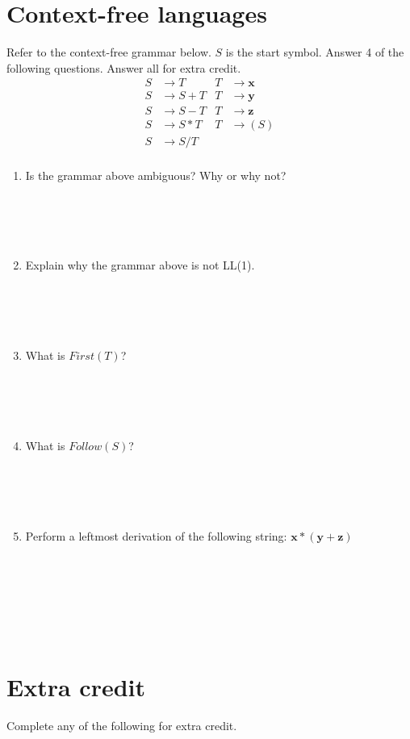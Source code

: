 \documentclass[10pt]{amsart}
\begin{document}
\section{Context-free languages}
Refer to the context-free grammar below. $S$ is the start symbol. Answer 4 of the following questions. Answer all for extra credit.
\begin{align*}
S &\to T &  T &\to \mathbf{x}\\
S &\to S + T &    T &\to \mathbf{y}\\
S &\to S - T &    T &\to \mathbf{z}\\
S &\to S * T &    T &\to ( S )\\
 S &\to S / T\\
\end{align*}
 \begin{enumerate}
\item Is the grammar above ambiguous? Why or why not?\\\\\\\\\\ %
\item Explain why the grammar above is not LL(1).\\\\\\\\\\ %
\item What is $First(T)$?\\\\\\\\\\ %
\item What is $Follow(S)$?\\\\\\\\\\ %
\item Perform a leftmost derivation of the following string: $\mathbf{x}*(\mathbf{y}+\mathbf{z})$\\\\\\\\\\\\\\
\end{enumerate}

\section{Extra credit}
Complete any of the following for extra credit.
\end{document}
